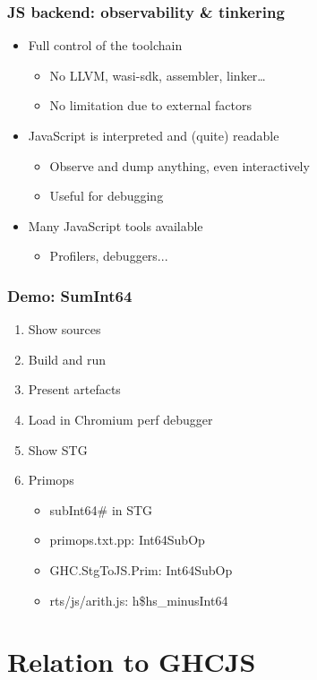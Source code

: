 \documentclass[aspectratio=169]{beamer}
\begin{document}
\begin{frame}
\frametitle{JS backend: observability \& tinkering}

\begin{itemize}
\item Full control of the toolchain 
\begin{itemize}
\item No LLVM, wasi-sdk, assembler, linker…
\item No limitation due to external factors
\end{itemize}
\item JavaScript is interpreted and (quite) readable
\begin{itemize}
\item Observe and dump anything, even interactively
\item Useful for debugging
\end{itemize}
\item Many JavaScript tools available
\begin{itemize}
\item Profilers, debuggers...
\end{itemize}
\end{itemize}
\end{frame}


\begin{frame}
\frametitle{Demo: SumInt64}
\begin{enumerate}
\item Show sources
\item Build and run
\item Present artefacts
\item Load in Chromium perf debugger
\item Show STG
\item Primops
  \begin{itemize}
    \item subInt64\# in STG
    \item primops.txt.pp: Int64SubOp
    \item GHC.StgToJS.Prim: Int64SubOp
    \item rts/js/arith.js: h\$hs\_minusInt64
  \end{itemize}
\end{enumerate}
\end{frame}

\section{Relation to GHCJS}
\end{document}
